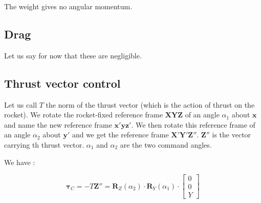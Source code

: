 \documentclass[a4paper, 12 pt]{article}
\begin{document}
The weight gives no angular momentum.

\subsection{Drag}

Let us say for now that these are negligible.

\subsection{Thrust vector control}

Let us call $T$ the norm of the thrust vector (which is the action of thrust on the rocket). We rotate the rocket-fixed reference frame $\bm{XYZ}$ of an angle $\alpha_1$ about $\bm x$ and
name the new reference frame $\bm{x'yz'}$. We then rotate this reference frame of an angle $\alpha_2$ about $\bm y'$ and we get the reference frame
$\bm{X'Y'Z''}$. $\bm Z''$ is the vector carrying th thrust vector. $\alpha_1$ and $\alpha_2$ are the two command angles.

We have :

$$\bm{\tau}_C = -T \bm Z'' = \bm R_Z(\alpha_2) \cdot \bm R_Y(\alpha_1) \cdot \left[\begin{array}{c} 0 \\ 0 \\ Y \end{array}\right]$$
\end{document}
